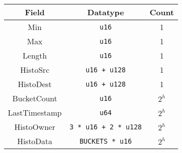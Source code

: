\begin{tabular}{ccc}\toprule
        Field & Datatype & Count \\ \midrule
        Min & \texttt{u16} & 1 \\
        Max & \texttt{u16} & 1 \\
        Length & \texttt{u16} & 1 \\
        HistoSrc & \texttt{u16 + u128} & 1 \\
        HistoDest & \texttt{u16 + u128} & 1 \\
        BucketCount & \texttt{u16} & $2^h$ \\
        LastTimestamp & \texttt{u64} & $2^h$ \\
        HistoOwner & \texttt{3 * u16 + 2 * u128} & $2^h$ \\
        HistoData & \texttt{BUCKETS * u16} & $2^h$ \\ \bottomrule
\end{tabular}